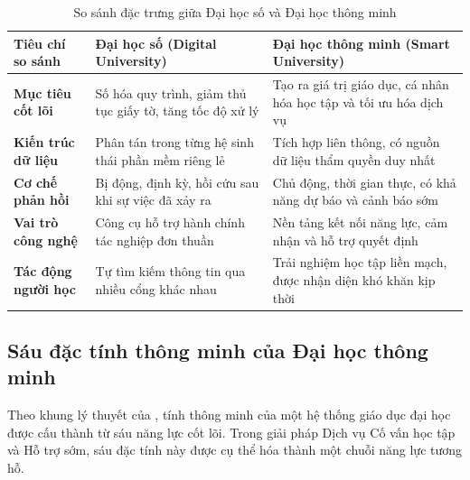 \begin{table}[htbp]
\centering
\caption{So sánh đặc trưng giữa Đại học số và Đại học thông minh}
\label{tab:so_sanh_digital_smart}
\vspace{0.2cm}
\begin{tabularx}{\textwidth}{|L{3.2cm}|Y|Y|}
\hline
\textbf{Tiêu chí so sánh} & \textbf{Đại học số (Digital University)} & \textbf{Đại học thông minh (Smart University)} \\
\hline
\textbf{Mục tiêu cốt lõi} & Số hóa quy trình, giảm thủ tục giấy tờ, tăng tốc độ xử lý & Tạo ra giá trị giáo dục, cá nhân hóa học tập và tối ưu hóa dịch vụ \\
\hline
\textbf{Kiến trúc dữ liệu} & Phân tán trong từng hệ sinh thái phần mềm riêng lẻ & Tích hợp liên thông, có nguồn dữ liệu thẩm quyền duy nhất \\
\hline
\textbf{Cơ chế phản hồi} & Bị động, định kỳ, hồi cứu sau khi sự việc đã xảy ra & Chủ động, thời gian thực, có khả năng dự báo và cảnh báo sớm \\
\hline
\textbf{Vai trò công nghệ} & Công cụ hỗ trợ hành chính tác nghiệp đơn thuần & Nền tảng kết nối năng lực, cảm nhận và hỗ trợ quyết định \\
\hline
\textbf{Tác động người học} & Tự tìm kiếm thông tin qua nhiều cổng khác nhau & Trải nghiệm học tập liền mạch, được nhận diện khó khăn kịp thời \\
\hline
\end{tabularx}
\end{table}

\subsection{Sáu đặc tính thông minh của Đại học thông minh}
Theo khung lý thuyết của \citet{uskov2018}, tính thông minh của một hệ thống giáo dục đại học được cấu thành từ sáu năng lực cốt lõi. Trong giải pháp Dịch vụ Cố vấn học tập và Hỗ trợ sớm, sáu đặc tính này được cụ thể hóa thành một chuỗi năng lực tương hỗ.

